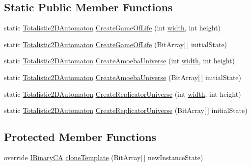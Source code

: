 \subsection*{Static Public Member Functions}
\begin{DoxyCompactItemize}
\item 
static \hyperlink{class_cellular_1_1_totalistic2_d_automaton}{Totalistic2\+D\+Automaton} \hyperlink{class_cellular_1_1_totalistic2_d_automaton_a76eeb87d529b320437eebbf664acf013}{Create\+Game\+Of\+Life} (int \hyperlink{class_cellular_1_1_automaton2_d_a1e9e5ec637c747a859c346839c90d174}{width}, int height)
\item 
static \hyperlink{class_cellular_1_1_totalistic2_d_automaton}{Totalistic2\+D\+Automaton} \hyperlink{class_cellular_1_1_totalistic2_d_automaton_aa8227b8be752f1c0e19f5cc6d605a011}{Create\+Game\+Of\+Life} (Bit\+Array\mbox{[}$\,$\mbox{]} initial\+State)
\item 
static \hyperlink{class_cellular_1_1_totalistic2_d_automaton}{Totalistic2\+D\+Automaton} \hyperlink{class_cellular_1_1_totalistic2_d_automaton_a79ed2d655e37829d26a9eed7974e726f}{Create\+Amoeba\+Universe} (int \hyperlink{class_cellular_1_1_automaton2_d_a1e9e5ec637c747a859c346839c90d174}{width}, int height)
\item 
static \hyperlink{class_cellular_1_1_totalistic2_d_automaton}{Totalistic2\+D\+Automaton} \hyperlink{class_cellular_1_1_totalistic2_d_automaton_a34a59a60c4a12e0b7904b37666385512}{Create\+Amoeba\+Universe} (Bit\+Array\mbox{[}$\,$\mbox{]} initial\+State)
\item 
static \hyperlink{class_cellular_1_1_totalistic2_d_automaton}{Totalistic2\+D\+Automaton} \hyperlink{class_cellular_1_1_totalistic2_d_automaton_a9f5a2308bc2b17ee7a9c779608e505ba}{Create\+Replicator\+Universe} (int \hyperlink{class_cellular_1_1_automaton2_d_a1e9e5ec637c747a859c346839c90d174}{width}, int height)
\item 
static \hyperlink{class_cellular_1_1_totalistic2_d_automaton}{Totalistic2\+D\+Automaton} \hyperlink{class_cellular_1_1_totalistic2_d_automaton_a0d8bbe04fcb603d8ff614864e39c386d}{Create\+Replicator\+Universe} (Bit\+Array\mbox{[}$\,$\mbox{]} initial\+State)
\end{DoxyCompactItemize}
\subsection*{Protected Member Functions}
\begin{DoxyCompactItemize}
\item 
override \hyperlink{interface_cellular_1_1_i_binary_c_a}{I\+Binary\+C\+A} \hyperlink{class_cellular_1_1_totalistic2_d_automaton_ad5cc3f46a556aa1b1c99bdfa92f5ba1d}{clone\+Template} (Bit\+Array\mbox{[}$\,$\mbox{]} new\+Instance\+State)
\end{DoxyCompactItemize}
